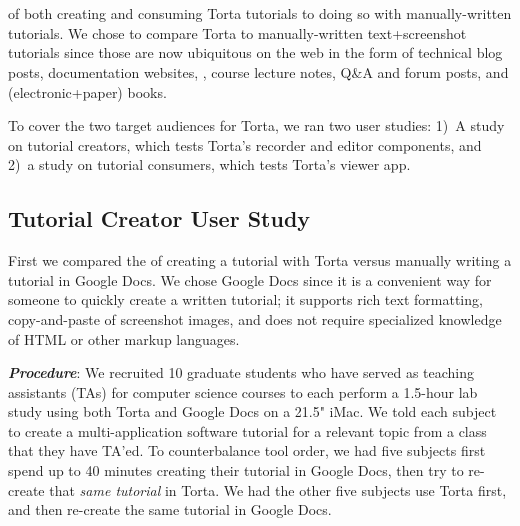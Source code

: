 \section{}

 of both creating and consuming Torta tutorials to doing
so with manually-written tutorials. We chose to  compare Torta to manually-written
text+screenshot tutorials since those are now ubiquitous on the web in the
form of technical blog posts, documentation websites, , course lecture
notes, Q\&A and forum posts, and (electronic+paper) books.
%

To cover the two target audiences for Torta, we ran two  user studies:
1)~A study on tutorial creators, which tests Torta's recorder and
editor components, and 2)~a study on tutorial consumers, which tests Torta's viewer app.


\subsection{Tutorial Creator User Study}

First we compared the  of creating a tutorial with Torta
versus manually writing a tutorial in Google Docs. We chose Google Docs
since it is a convenient way for someone to quickly create a written tutorial; it
supports rich text formatting, copy-and-paste of screenshot images, and
does not require specialized knowledge of HTML or other markup
languages. 

\emph{\textbf{Procedure}}: We recruited 10 graduate students who have
served as teaching assistants (TAs) for computer science courses to each
perform a 1.5-hour lab study using both Torta and Google Docs on a 21.5"
iMac. We told each subject to create a multi-application software
tutorial for a relevant topic from a class that they have TA'ed. To
counterbalance tool order, we had five subjects first spend up to 40 minutes
creating their tutorial in Google Docs, then try to
re-create that \emph{same tutorial} in Torta. We had the other five
subjects use Torta first, and then re-create the same tutorial in Google
Docs.

